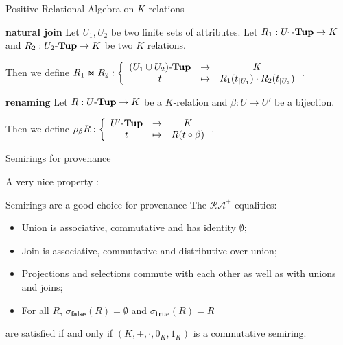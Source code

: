\documentclass[11pt]{beamer}
\newcommand{\utup}{\text{$U$-\textbf{Tup}}}
\newcommand{\vtup}[1]{\text{$#1$-\textbf{Tup}}}
\begin{document}
\begin{frame}[allowframebreaks]{Positive Relational Algebra on $K$-relations}
\begin{list}{}{}
			\item[\textbf{natural join}] Let $U_1,U_2$ be two finite sets of attributes. Let $R_1 : \vtup{U_1} \to K$ and $R_2 : \vtup{U_2} \to K$ be two $K$ relations.
			
		Then we define $R_1 \Join R_2: 
			\left\lbrace 
			\begin{array}{c c c}
			\vtup{(U_1 \cup U_2)} & \to & K \\
			t & \mapsto & R_1(t_{|U_1}) \cdot R_2(t_{|U_2})
			\end{array}
			  \right.$.
			  
			  
			 \item[\textbf{renaming}] Let $R : \utup \to K$ be a $K$-relation and $\beta : U \to U'$ be a bijection.
			 
			 Then we define $\rho_\beta R: 
			\left\lbrace 
			\begin{array}{c c c}
			\vtup{U'} & \to & K \\
			t & \mapsto & R(t \circ \beta)
			\end{array}
			  \right.$.
		
		\end{list}

\end{frame}

\begin{frame}{Semirings for provenance}

A very nice property :

\begin{block}{Semirings are a good choice for provenance}
The $\mathcal{RA}^+$ equalities:
		
		\begin{itemize}
		
			\item Union is associative, commutative and has identity $\emptyset$;
			
			\item Join is associative, commutative and distributive over union;
			
			\item Projections and selections commute with each other as well as with unions and joins;
			
			\item For all $R$, $\sigma_{\textbf{false}}(R)=\emptyset$ and $\sigma_{\textbf{true}}(R)=R$
			
		\end{itemize}
		
		are satisfied if and only if $(K,+,\cdot,0_K,1_K)$ is a commutative semiring.
\end{block}

\end{frame}
\end{document}
